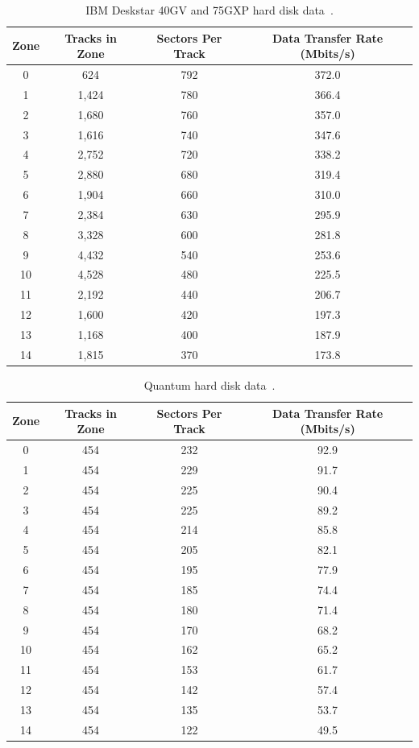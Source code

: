 \documentclass[12pt]{ucthesis}
\newcommand{\captionfonts}{\small\bf\ssp}
\begin{document}
\begin{table}[h!]
\begin{center}

\begin{tabular}{|c|c|c|c|}
\hline 
Zone & Tracks in Zone & Sectors Per Track & Data Transfer Rate (Mbits/s)
\tabularnewline
\hline
0 & 624 & 792 & 372.0
\tabularnewline
\hline
1 & 1,424 & 780 & 366.4
\tabularnewline
\hline
2 & 1,680 & 760 & 357.0
\tabularnewline
\hline
3 & 1,616 & 740 & 347.6
\tabularnewline
\hline
4 & 2,752 & 720 & 338.2
\tabularnewline
\hline
5 & 2,880 & 680 & 319.4
\tabularnewline
\hline
6 & 1,904 & 660 & 310.0
\tabularnewline
\hline
7 & 2,384 & 630 & 295.9
\tabularnewline
\hline
8 & 3,328 & 600 & 281.8
\tabularnewline
\hline
9 & 4,432 & 540 & 253.6
\tabularnewline
\hline
10 & 4,528 & 480 & 225.5
\tabularnewline
\hline
11 & 2,192 & 440 & 206.7
\tabularnewline
\hline
12 & 1,600 & 420 & 197.3
\tabularnewline
\hline
13 & 1,168 & 400 & 187.9
\tabularnewline
\hline
14 & 1,815 & 370 & 173.8
\tabularnewline
\hline
\end{tabular}

\captionfonts
\caption[IBM Deskstar 40GV and 75GXP Data]{IBM Deskstar 40GV and 75GXP hard disk data~\cite{ibm:manual}.}
\label{table:ibm_data}
\end{center}
\end{table}

\begin{table}[h!]
\begin{center}

\begin{tabular}{|c|c|c|c|}
\hline 
Zone & Tracks in Zone & Sectors Per Track & Data Transfer Rate (Mbits/s)
\tabularnewline
\hline
0 & 454 & 232 & 92.9
\tabularnewline
\hline
1 & 454 & 229 & 91.7
\tabularnewline
\hline
2 & 454 & 225 & 90.4
\tabularnewline
\hline
3 & 454 & 225 & 89.2
\tabularnewline
\hline
4 & 454 & 214 & 85.8
\tabularnewline
\hline
5 & 454 & 205 & 82.1
\tabularnewline
\hline
6 & 454 & 195 & 77.9
\tabularnewline
\hline
7 & 454 & 185 & 74.4
\tabularnewline
\hline
8 & 454 & 180 & 71.4
\tabularnewline
\hline
9 & 454 & 170 & 68.2
\tabularnewline
\hline
10  & 454 & 162 & 65.2
\tabularnewline
\hline
11 & 454 & 153 & 61.7
\tabularnewline
\hline
12 & 454 & 142 & 57.4
\tabularnewline
\hline
13 & 454 & 135 & 53.7
\tabularnewline
\hline
14 & 454 & 122 & 49.5
\tabularnewline
\hline
\end{tabular}

\captionfonts
\caption[Quantum Fireball Data]{Quantum hard disk data~\cite{quantum:manual}.}
\label{table:quantum_data}
\end{center}
\end{table}
\end{document}

